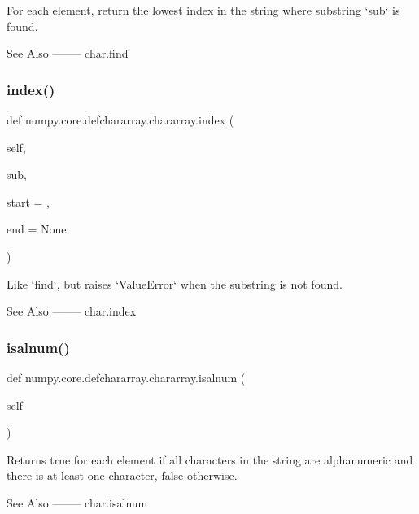 \begin{DoxyVerb}For each element, return the lowest index in the string where
substring `sub` is found.

See Also
--------
char.find\end{DoxyVerb}
 \mbox{\label{classnumpy_1_1core_1_1defchararray_1_1chararray_ab2058399eb54ddb39446641d00a6670b}} 
\subsubsection{\texorpdfstring{index()}{index()}}
{\footnotesize\ttfamily def numpy.\+core.\+defchararray.\+chararray.\+index (\begin{DoxyParamCaption}\item[{}]{self,  }\item[{}]{sub,  }\item[{}]{start = {},  }\item[{}]{end = {\ttfamily None} }\end{DoxyParamCaption})}

\begin{DoxyVerb}Like `find`, but raises `ValueError` when the substring is not found.

See Also
--------
char.index\end{DoxyVerb}
 \mbox{\label{classnumpy_1_1core_1_1defchararray_1_1chararray_a8bae4cc0960a39357616e8a412a27f88}} 
\subsubsection{\texorpdfstring{isalnum()}{isalnum()}}
{\footnotesize\ttfamily def numpy.\+core.\+defchararray.\+chararray.\+isalnum (\begin{DoxyParamCaption}\item[{}]{self }\end{DoxyParamCaption})}

\begin{DoxyVerb}Returns true for each element if all characters in the string
are alphanumeric and there is at least one character, false
otherwise.

See Also
--------
char.isalnum\end{DoxyVerb}
 \mbox{\label{classnumpy_1_1core_1_1defchararray_1_1chararray_a43b49d7a0813bb4665e3b42d2c182819}} 
